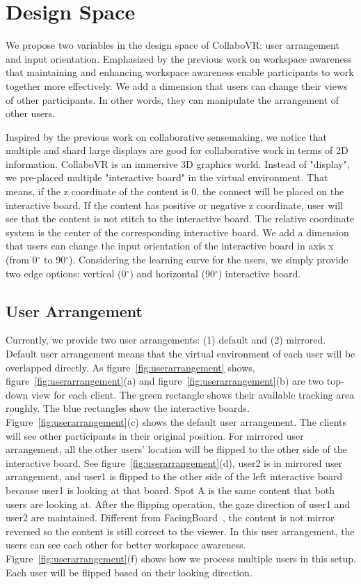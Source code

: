 \documentclass{sigchi}
\begin{document}
\section{Design Space}
We propose two variables in the design space of CollaboVR: user arrangement and input orientation. Emphasized by the previous work on workspace awareness that maintaining and enhancing workspace awareness enable participants to work together more effectively. We add a dimension that users can change their views of other participants. In other words, they can manipulate the arrangement of other users. 

Inspired by the previous work on collaborative sensemaking, we notice that multiple and shard large displays are good for collaborative work in terms of 2D information. CollaboVR is an immersive 3D graphics world. Instead of "display", we pre-placed multiple "interactive board" in the virtual environment. That means, if the z coordinate of the content is 0, the connect will be placed on the interactive board. If the content has positive or negative z coordinate, user will see that the content is not stitch to the interactive board. The relative coordinate system is the center of the corresponding interactive board. We add a dimension that users can change the input orientation of the interactive board in axis x (from 0$^{\circ}$ to 90$^{\circ}$). Considering the learning curve for the users, we simply provide two edge options: vertical (0$^{\circ}$) and horizontal (90$^{\circ}$) interactive board.

\subsection{User Arrangement}
Currently, we provide two user arrangements: (1) default and (2) mirrored. Default user arrangement means that the virtual environment of each user will be overlapped directly. As figure~\ref{fig:userarrangement} shows, figure~\ref{fig:userarrangement}(a) and figure~\ref{fig:userarrangement}(b) are two top-down view for each client. The green rectangle shows their available tracking area roughly. The blue rectangles show the interactive boards. Figure~\ref{fig:userarrangement}(c) shows the default user arrangement. The clients will see other participants in their original position. For mirrored user arrangement, all the other users' location will be flipped to the other side of the interactive board. See figure~\ref{fig:userarrangement}(d), user2 is in mirrored user arrangement, and user1 is flipped to the other side of the left interactive board because user1 is looking at that board. Spot A is the same content that both users are looking at. After the flipping operation, the gaze direction of user1 and user2 are maintained. Different from FacingBoard~\cite{li2014interactive}, the content is not mirror reversed so the content is still correct to the viewer. In this user arrangement, the users can see each other for better workspace awareness. Figure~\ref{fig:userarrangement}(f) shows how we process multiple users in this setup. Each user will be flipped based on their looking direction.
\end{document}
